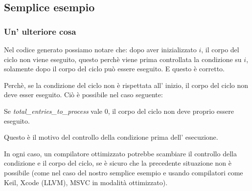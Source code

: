 \subsection{Semplice esempio}





\subsubsection{Un' ulteriore cosa}

Nel codice generato possiamo notare che: 
dopo aver inizializzato $i$, il corpo del ciclo non viene eseguito,
questo perchè viene prima controllata la condizione su $i$, solamente dopo il corpo del ciclo può essere eseguito.
E questo è corretto. 

Perchè, se la condizione del ciclo non è rispettata all' inizio,
 il corpo del ciclo non deve esser eseguito.
Ciò è possibile nel caso seguente:



Se \emph{total\_entries\_to\_process} vale 0, il corpo del ciclo non deve proprio essere eseguito.

Questo è il motivo del controllo della condizione prima dell' esecuzione.

In ogni caso, un compilatore ottimizzato potrebbe scambiare il controllo della condizione e il corpo del ciclo,
se è sicuro che la precedente situazione non è possibile
(come nel caso del nostro semplice esempio e usando compilatori come Keil, Xcode (LLVM), MSVC in modalità ottimizzato).
